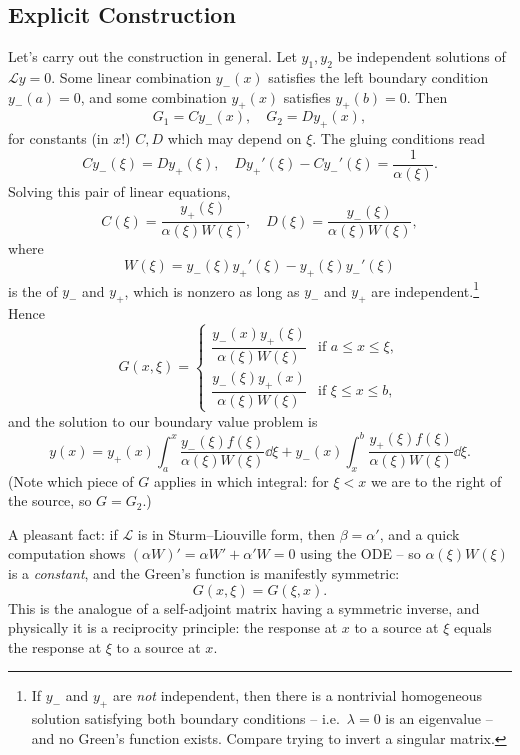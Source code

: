 \documentclass[a4paper]{scrartcl}
\begin{document}
\subsection{Explicit Construction}

Let's carry out the construction in general. Let $y_1, y_2$ be independent solutions of $\mathcal{L} y = 0$. Some linear combination $y_-(x)$ satisfies the left boundary condition $y_-(a) = 0$, and some combination $y_+(x)$ satisfies $y_+(b) = 0$. Then
$$
G_1 = C y_-(x), \quad G_2 = D y_+(x),
$$
for constants (in $x$!) $C, D$ which may depend on $\xi$. The gluing conditions read
$$
C y_-(\xi) = D y_+(\xi), \quad D y_+'(\xi) - C y_-'(\xi) = \frac{1}{\alpha(\xi)}.
$$
Solving this pair of linear equations,
$$
C(\xi) = \frac{y_+(\xi)}{\alpha(\xi) W(\xi)}, \quad D(\xi) = \frac{y_-(\xi)}{\alpha(\xi) W(\xi)},
$$
where
$$
W(\xi) = y_-(\xi) y_+'(\xi) - y_+(\xi) y_-'(\xi)
$$
is the  of $y_-$ and $y_+$, which is nonzero as long as $y_-$ and $y_+$ are independent.\footnote{If $y_-$ and $y_+$ are \emph{not} independent, then there is a nontrivial homogeneous solution satisfying both boundary conditions -- i.e.\ $\lambda = 0$ is an eigenvalue -- and no Green's function exists. Compare trying to invert a singular matrix.} Hence
$$
G(x, \xi) = \begin{cases}
    \dfrac{y_-(x) y_+(\xi)}{\alpha(\xi) W(\xi)} &\mbox{if } a \leq x \leq \xi, \\[2ex]
    \dfrac{y_-(\xi) y_+(x)}{\alpha(\xi) W(\xi)} &\mbox{if } \xi \leq x \leq b,
\end{cases}
$$
and the solution to our boundary value problem is
$$
y(x) = y_+(x) \int_a^x \frac{y_-(\xi) f(\xi)}{\alpha(\xi) W(\xi)} \dd \xi + y_-(x) \int_x^b \frac{y_+(\xi) f(\xi)}{\alpha(\xi) W(\xi)} \dd \xi.
$$
(Note which piece of $G$ applies in which integral: for $\xi < x$ we are to the right of the source, so $G = G_2$.)

A pleasant fact: if $\mathcal{L}$ is in Sturm--Liouville form, then $\beta = \alpha'$, and a quick computation shows $(\alpha W)' = \alpha W' + \alpha' W = 0$ using the ODE -- so $\alpha(\xi) W(\xi)$ is a \emph{constant}, and the Green's function is manifestly symmetric:
$$
G(x, \xi) = G(\xi, x).
$$
This is the analogue of a self-adjoint matrix having a symmetric inverse, and physically it is a reciprocity principle: the response at $x$ to a source at $\xi$ equals the response at $\xi$ to a source at $x$.
\end{document}
